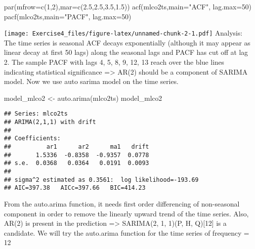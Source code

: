 \documentclass[
]{article}
\newenvironment{Shaded}{\begin{snugshade}}{\end{snugshade}}
\newcommand{\AttributeTok}[1]{\textcolor[rgb]{0.77,0.63,0.00}{#1}}
\newcommand{\DecValTok}[1]{\textcolor[rgb]{0.00,0.00,0.81}{#1}}
\newcommand{\FloatTok}[1]{\textcolor[rgb]{0.00,0.00,0.81}{#1}}
\newcommand{\FunctionTok}[1]{\textcolor[rgb]{0.00,0.00,0.00}{#1}}
\newcommand{\NormalTok}[1]{#1}
\newcommand{\OtherTok}[1]{\textcolor[rgb]{0.56,0.35,0.01}{#1}}
\newcommand{\SpecialCharTok}[1]{\textcolor[rgb]{0.00,0.00,0.00}{#1}}
\newcommand{\StringTok}[1]{\textcolor[rgb]{0.31,0.60,0.02}{#1}}
\begin{document}
\begin{Shaded}
\begin{Highlighting}[]
\FunctionTok{par}\NormalTok{(}\AttributeTok{mfrow=}\FunctionTok{c}\NormalTok{(}\DecValTok{1}\NormalTok{,}\DecValTok{2}\NormalTok{),}\AttributeTok{mar=}\FunctionTok{c}\NormalTok{(}\FloatTok{2.5}\NormalTok{,}\FloatTok{2.5}\NormalTok{,}\FloatTok{3.5}\NormalTok{,}\FloatTok{1.5}\NormalTok{))}
\FunctionTok{acf}\NormalTok{(mlco2ts,}\AttributeTok{main=}\StringTok{"ACF"}\NormalTok{, }\AttributeTok{lag.max=}\DecValTok{50}\NormalTok{) }
\FunctionTok{pacf}\NormalTok{(mlco2ts,}\AttributeTok{main=}\StringTok{"PACF"}\NormalTok{, }\AttributeTok{lag.max=}\DecValTok{50}\NormalTok{) }
\end{Highlighting}
\end{Shaded}

\texttt{[image: Exercise4\_files/figure-latex/unnamed-chunk-2-1.pdf]}
Analysis: The time series is seasonal ACF decays exponentially (although
it may appear as linear decay at first 50 lags) along the seasonal lags
and PACF has cut off at lag 2. The sample PACF with lags 4, 5, 8, 9, 12,
13 reach over the blue lines indicating statistical significance
=\textgreater{} AR(2) should be a component of SARIMA model. Now we use
auto sarima model on the time series.

\begin{Shaded}
\begin{Highlighting}[]
\NormalTok{model\_mlco2 }\OtherTok{\textless{}{-}} \FunctionTok{auto.arima}\NormalTok{(mlco2ts)}
\NormalTok{model\_mlco2}
\end{Highlighting}
\end{Shaded}

\begin{verbatim}
## Series: mlco2ts 
## ARIMA(2,1,1) with drift 
## 
## Coefficients:
##          ar1      ar2      ma1   drift
##       1.5336  -0.8358  -0.9357  0.0778
## s.e.  0.0368   0.0364   0.0191  0.0093
## 
## sigma^2 estimated as 0.3561:  log likelihood=-193.69
## AIC=397.38   AICc=397.66   BIC=414.23
\end{verbatim}

From the auto.arima function, it needs first order differencing of
non-seasonal component in order to remove the linearly upward trend of
the time series. Also, AR(2) is present in the prediction
=\textgreater{} SARIMA(2, 1, 1)(P, H, Q){[}12{]} is a candidate. We will
try the auto.arima function for the time series of frequency = 12

\begin{Shaded}
\end{Shaded}
\end{document}

